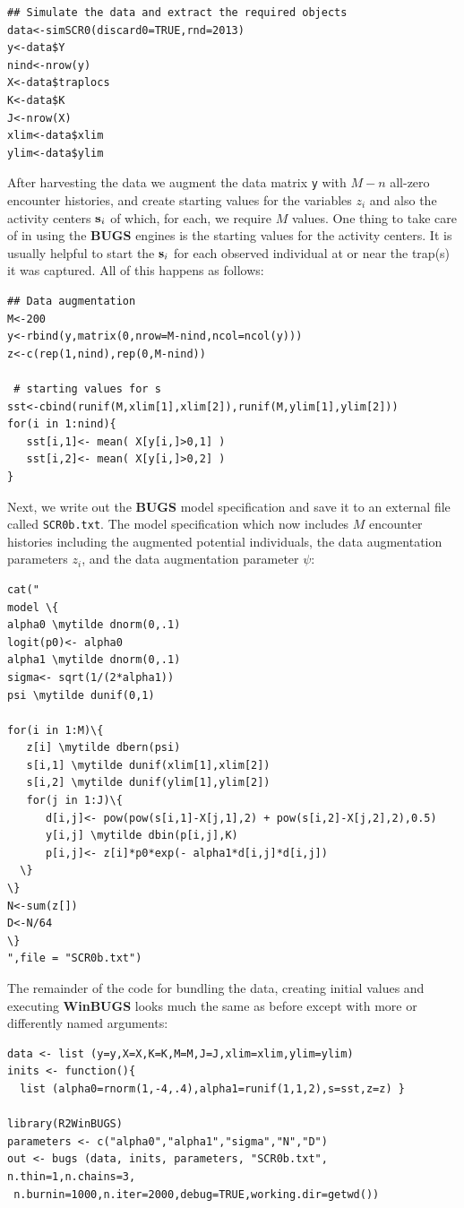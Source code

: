 {\small
\begin{verbatim}
## Simulate the data and extract the required objects
data<-simSCR0(discard0=TRUE,rnd=2013)
y<-data$Y
nind<-nrow(y)
X<-data$traplocs
K<-data$K
J<-nrow(X)
xlim<-data$xlim
ylim<-data$ylim
\end{verbatim}
}
 After harvesting the data we
 augment the data matrix \mbox{\tt y}
with $M-n$ all-zero encounter histories, and create starting
values for the variables $z_{i}$ and also the activity centers ${\bf
  s}_{i}$ of which, for each, we require $M$ values.
 One thing to take care of in using the {\bf BUGS}
engines is the starting values for the activity centers. It is usually
helpful to start the ${\bf s}_{i}$ for each observed individual at or
near the trap(s) it was captured. All of this happens as follows:
{\small
\begin{verbatim}
## Data augmentation
M<-200
y<-rbind(y,matrix(0,nrow=M-nind,ncol=ncol(y)))
z<-c(rep(1,nind),rep(0,M-nind))

 # starting values for s
sst<-cbind(runif(M,xlim[1],xlim[2]),runif(M,ylim[1],ylim[2]))
for(i in 1:nind){
   sst[i,1]<- mean( X[y[i,]>0,1] )
   sst[i,2]<- mean( X[y[i,]>0,2] )
}
\end{verbatim}
}
Next, we write out the {\bf BUGS} model specification and save it to
an external file called \mbox{\tt SCR0b.txt}. The model
 specification which now includes $M$
encounter histories including the augmented potential individuals, the
data augmentation parameters $z_{i}$, and the data augmentation
parameter $\psi$:
{\small
\begin{Verbatim}[commandchars=\\\{\}]
cat("
model \{
alpha0 \mytilde dnorm(0,.1)
logit(p0)<- alpha0
alpha1 \mytilde dnorm(0,.1)
sigma<- sqrt(1/(2*alpha1))
psi \mytilde dunif(0,1)

for(i in 1:M)\{
   z[i] \mytilde dbern(psi)
   s[i,1] \mytilde dunif(xlim[1],xlim[2])
   s[i,2] \mytilde dunif(ylim[1],ylim[2])
   for(j in 1:J)\{
      d[i,j]<- pow(pow(s[i,1]-X[j,1],2) + pow(s[i,2]-X[j,2],2),0.5)
      y[i,j] \mytilde dbin(p[i,j],K)
      p[i,j]<- z[i]*p0*exp(- alpha1*d[i,j]*d[i,j])
  \}
\}
N<-sum(z[])
D<-N/64
\}
",file = "SCR0b.txt")
\end{Verbatim}
}
The
remainder of the code for bundling the data, creating initial values
and executing {\bf WinBUGS} looks much the same as before except with more
or differently named arguments:
{\small
\begin{verbatim}
data <- list (y=y,X=X,K=K,M=M,J=J,xlim=xlim,ylim=ylim)
inits <- function(){
  list (alpha0=rnorm(1,-4,.4),alpha1=runif(1,1,2),s=sst,z=z) }

library(R2WinBUGS)
parameters <- c("alpha0","alpha1","sigma","N","D")
out <- bugs (data, inits, parameters, "SCR0b.txt", n.thin=1,n.chains=3,
 n.burnin=1000,n.iter=2000,debug=TRUE,working.dir=getwd())
\end{verbatim}
}

